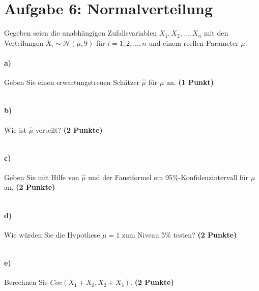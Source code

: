 \documentclass[10pt, a4paper]{article}
\begin{document}
\section{Aufgabe 6: Normalverteilung}
Gegeben seien die unabhängigen Zufallsvariablen $X_1,X_2,...,X_n$ mit den Verteilungen $X_i \sim \mathcal{N}(\mu,9)$ für $i= 1,2,...,n$ und einem reellen Parameter $\mu$.
\paragraph{a)} Geben Sie einen erwartungstreuen Schätzer $\hat{\mu}$ für $\mu$ an. \textbf{(1 Punkt)}\\
\begin{tabular}{| p{17cm} |}
    \hline
    \\\hline
\end{tabular}

\paragraph{b)} Wie ist $\hat{\mu}$ verteilt? \textbf{(2 Punkte)}\\
\begin{tabular}{| p{17cm} |}
    \hline
    \\\hline
\end{tabular}

\paragraph{c)} Geben Sie mit Hilfe von $\hat{\mu}$ und der Faustformel ein 95\%-Konfidenzintervall für $\mu$ an. \textbf{(2 Punkte)}\\
\begin{tabular}{| p{17cm} |}
    \hline
    \\\hline
\end{tabular}

\paragraph{d)} Wie würden Sie die Hypothese $\mu= 1$ zum Niveau 5\% testen? \textbf{(2 Punkte)}\\
\begin{tabular}{| p{17cm} |}
    \hline
    \\\hline
\end{tabular}

\paragraph{e)} Berechnen Sie $Cov(X_1+X_2,X_2+X_3)$. \textbf{(2 Punkte)}\\
\begin{tabular}{| p{17cm} |}
    \hline
    \\\hline
\end{tabular}
\end{document}
